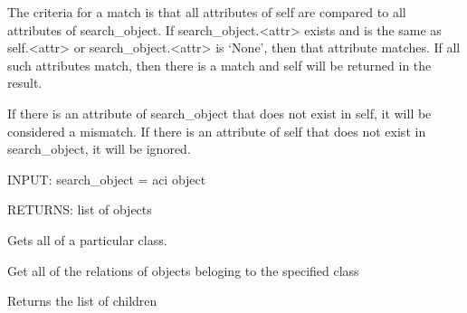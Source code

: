 \documentclass[letterpaper,10pt,english]{sphinxmanual}
\begin{document}
\begin{fulllineitems}
\begin{fulllineitems}
\begin{description}
The criteria for a match is that all attributes of self are
compared to all attributes of search\_object.
If search\_object.\textless{}attr\textgreater{} exists and is the same as self.\textless{}attr\textgreater{} or
search\_object.\textless{}attr\textgreater{} is `None', then that attribute matches.
If all such attributes match, then there is a match and self will
be returned in the result.

If there is an attribute of search\_object that does not exist in
self, it will be considered a mismatch.
If there is an attribute of self that does not exist in
search\_object, it will be ignored.

\end{description}

INPUT: search\_object = aci object

RETURNS: list of objects

\end{fulllineitems}


\begin{fulllineitems}
\label{acibaseobject:acibaseobject.BaseACIObject.get}
Gets all of a particular class.

\end{fulllineitems}


\begin{fulllineitems}
\label{acibaseobject:acibaseobject.BaseACIObject.get_all_attached}
Get all of the relations of objects beloging to the
specified class

\end{fulllineitems}


\begin{fulllineitems}
\label{acibaseobject:acibaseobject.BaseACIObject.get_children}
Returns the list of children

\end{fulllineitems}


\end{fulllineitems}
\end{document}
